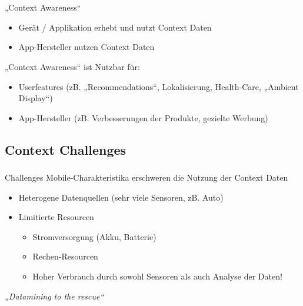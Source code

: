 \begin{frame}
    \frametitle{\insertsubsection \ \ \small \cite{context2015} \cite{orsini2016}} 
    „Context Awareness“
    \begin{itemize}
        \setlength\itemsep{0.7em}
        \item Gerät / Applikation erhebt und nutzt Context Daten
        \item App-Hersteller nutzen Context Daten
    \end{itemize}
    \vspace{2em}

    \begin{block}{„Context Awareness“ ist Nutzbar für:}
        \begin{itemize}%
            \setlength\itemsep{0.7em}
            \item Userfeatures (zB. „Recommendations“, Lokalisierung, Health-Care, „Ambient Display“)
            \item App-Hersteller (zB. Verbesserungen der Produkte, gezielte Werbung)
        \end{itemize}
    \end{block}
\end{frame}

\subsection{Context Challenges}

\begin{frame}
    \frametitle{\insertsubsection} 
    \begin{block}{Challenges \cite{context2015} \cite{orsini2016}}
        \vspace{0.5em}
        Mobile-Charakteristika erschweren die Nutzung der Context Daten 
        \vspace{1em}
        \begin{itemize}%
            \setlength\itemsep{1em}
            \item Heterogene Datenquellen (sehr viele Sensoren, zB. Auto)
            \item Limitierte Resourcen
            \begin{itemize}%
                \setlength\itemsep{0.4em}
                \item Stromversorgung (Akku, Batterie) 
                \item Rechen-Resourcen
                \item Hoher Verbrauch durch sowohl Sensoren als auch Analyse der Daten!
            \end{itemize}
        \end{itemize}
    \end{block}
    \vspace{1em}
    \emph{„Datamining to the rescue“}
\end{frame}